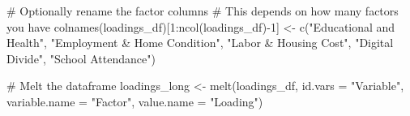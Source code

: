 \documentclass[
  letterpaper,
  DIV=11,
  numbers=noendperiod]{scrreprt}
\newenvironment{Shaded}{\begin{snugshade}}{\end{snugshade}}
\newcommand{\AttributeTok}[1]{\textcolor[rgb]{0.40,0.45,0.13}{#1}}
\newcommand{\CommentTok}[1]{\textcolor[rgb]{0.37,0.37,0.37}{#1}}
\newcommand{\DecValTok}[1]{\textcolor[rgb]{0.68,0.00,0.00}{#1}}
\newcommand{\FunctionTok}[1]{\textcolor[rgb]{0.28,0.35,0.67}{#1}}
\newcommand{\NormalTok}[1]{\textcolor[rgb]{0.00,0.23,0.31}{#1}}
\newcommand{\OtherTok}[1]{\textcolor[rgb]{0.00,0.23,0.31}{#1}}
\newcommand{\SpecialCharTok}[1]{\textcolor[rgb]{0.37,0.37,0.37}{#1}}
\newcommand{\StringTok}[1]{\textcolor[rgb]{0.13,0.47,0.30}{#1}}
\begin{document}
\begin{Shaded}
\begin{Highlighting}[]
\CommentTok{\# Optionally rename the factor columns}
\CommentTok{\# This depends on how many factors you have}
\FunctionTok{colnames}\NormalTok{(loadings\_df)[}\DecValTok{1}\SpecialCharTok{:}\FunctionTok{ncol}\NormalTok{(loadings\_df)}\SpecialCharTok{{-}}\DecValTok{1}\NormalTok{] }\OtherTok{\textless{}{-}} \FunctionTok{c}\NormalTok{(}\StringTok{"Educational and Health"}\NormalTok{,}
                                                  \StringTok{"Employment \& Home Condition"}\NormalTok{,}
                                                  \StringTok{"Labor \& Housing Cost"}\NormalTok{,}
                                                  \StringTok{"Digital Divide"}\NormalTok{,}
                                                  \StringTok{"School Attendance"}\NormalTok{)}

\CommentTok{\# Melt the dataframe}
\NormalTok{loadings\_long }\OtherTok{\textless{}{-}} \FunctionTok{melt}\NormalTok{(loadings\_df, }\AttributeTok{id.vars =} \StringTok{"Variable"}\NormalTok{, }\AttributeTok{variable.name =} \StringTok{"Factor"}\NormalTok{, }\AttributeTok{value.name =} \StringTok{"Loading"}\NormalTok{)}


\end{Highlighting}
\end{Shaded}
\end{document}
